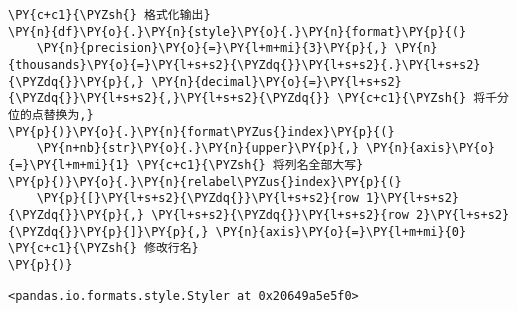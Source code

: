     \begin{tcolorbox}[breakable, size=fbox, boxrule=1pt, pad at break*=1mm,colback=cellbackground, colframe=cellborder]
\begin{Verbatim}[commandchars=\\\{\}]
\PY{c+c1}{\PYZsh{} 格式化输出}
\PY{n}{df}\PY{o}{.}\PY{n}{style}\PY{o}{.}\PY{n}{format}\PY{p}{(}
    \PY{n}{precision}\PY{o}{=}\PY{l+m+mi}{3}\PY{p}{,} \PY{n}{thousands}\PY{o}{=}\PY{l+s+s2}{\PYZdq{}}\PY{l+s+s2}{.}\PY{l+s+s2}{\PYZdq{}}\PY{p}{,} \PY{n}{decimal}\PY{o}{=}\PY{l+s+s2}{\PYZdq{}}\PY{l+s+s2}{,}\PY{l+s+s2}{\PYZdq{}} \PY{c+c1}{\PYZsh{} 将千分位的点替换为,}
\PY{p}{)}\PY{o}{.}\PY{n}{format\PYZus{}index}\PY{p}{(}
    \PY{n+nb}{str}\PY{o}{.}\PY{n}{upper}\PY{p}{,} \PY{n}{axis}\PY{o}{=}\PY{l+m+mi}{1} \PY{c+c1}{\PYZsh{} 将列名全部大写}
\PY{p}{)}\PY{o}{.}\PY{n}{relabel\PYZus{}index}\PY{p}{(}
    \PY{p}{[}\PY{l+s+s2}{\PYZdq{}}\PY{l+s+s2}{row 1}\PY{l+s+s2}{\PYZdq{}}\PY{p}{,} \PY{l+s+s2}{\PYZdq{}}\PY{l+s+s2}{row 2}\PY{l+s+s2}{\PYZdq{}}\PY{p}{]}\PY{p}{,} \PY{n}{axis}\PY{o}{=}\PY{l+m+mi}{0} \PY{c+c1}{\PYZsh{} 修改行名}
\PY{p}{)}
\end{Verbatim}
\end{tcolorbox}

            \begin{tcolorbox}[breakable, size=fbox, boxrule=.5pt, pad at break*=1mm, opacityfill=0]
\begin{Verbatim}[commandchars=\\\{\}]
<pandas.io.formats.style.Styler at 0x20649a5e5f0>
\end{Verbatim}
\end{tcolorbox}

